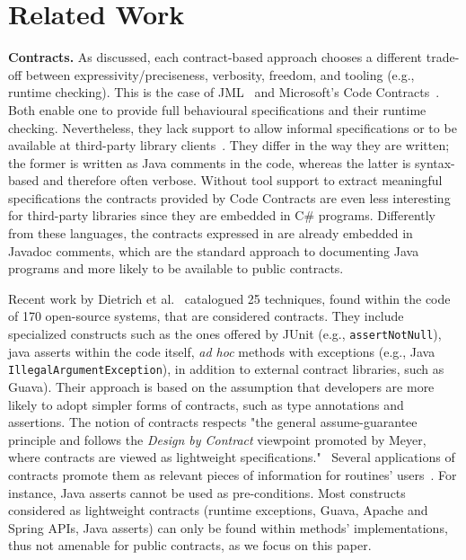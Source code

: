 \section{Related Work}
\label{sec:relatedWork}

\textbf{Contracts.} 
As discussed, each contract-based approach choo\-ses a different trade-off between expressivity/preciseness, verbosity, freedom, and tooling (e.g., runtime checking).
This is the case of JML~\cite{jml} and Microsoft's Code Contracts~\cite{codeContractsPaper}.
Both enable one to provide full behavioural specifications and their runtime checking.
Nevertheless, they lack support to allow informal specifications or to be available at third-party
library clients~\cite{Parnas2011}. They differ in the way they are written; the former is written as Java comments in the code, whereas the latter is syntax-based and therefore often verbose. 
Without tool support to extract meaningful specifications the contracts provided by Code Contracts are even less interesting for third-party libraries since they are embedded in C\# programs. Differently from these languages, the contracts expressed in \contractjdoc{} are already embedded in Javadoc comments, which are the standard approach to documenting Java programs and more likely to be available to public contracts.

Recent work by Dietrich et al.~\cite{Dietrich2017} catalogued 25 techniques, found within the code of 170 open-source systems, that are considered contracts. They include specialized constructs such as the ones offered by JUnit (e.g., \texttt{assertNotNull}), java asserts within the code itself, \emph{ad hoc} methods with exceptions (e.g., Java \texttt{IllegalArgumentException}), in addition to external contract libraries, such as Guava). 
Their approach is based on the assumption that developers are more likely to adopt simpler forms of contracts, such as type annotations and assertions. The notion of contracts respects "the general assume-guarantee principle and follows the \emph{Design by Contract} viewpoint promoted by Meyer, where contracts are viewed as lightweight specifications."~\cite{dbc} 
Several applications of contracts promote them as relevant pieces of information for routines' users~\cite{docAnalysis}. For instance, Java asserts cannot be used as pre-conditions. Most constructs considered as lightweight contracts (runtime exceptions, Guava, Apache and Spring APIs, Java asserts) can only be found within methods' implementations, thus not amenable for public contracts, as we focus on this paper.


